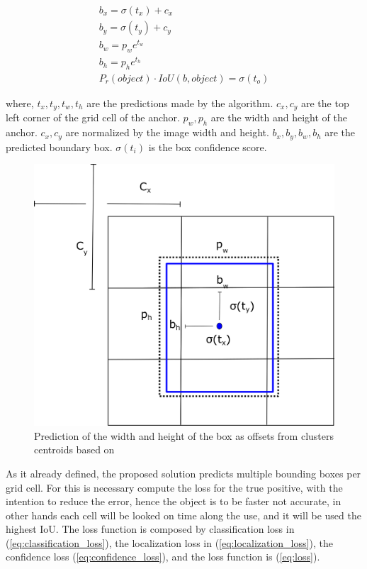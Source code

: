     
    \begin{equation}
    \label{eq:bound}
    \begin{aligned}
        b_x = \sigma(t_x) + c_x \\
        b_y = \sigma(t_y) + c_y \\
        b_w = p_we^{t_w} \\
        b_h = p_he^{t_h} \\
        P_r(object)\cdot IoU(b,object) = \sigma(t_o)
    \end{aligned}
    \end{equation}

where, $t_x, t_y, t_w, t_h$ are the predictions made by the algorithm. 
$c_x, c_y$ are the top left corner of the grid cell of the anchor.
$p_w, p_h$ are the width and height of the anchor. 
$c_x, c_y$ are normalized by the image width and height. 
$b_x, b_y, b_w, b_h$ are the predicted boundary box. 
$\sigma(t_i)$ is the box confidence score.

\begin{figure}[H]
\centering
\includegraphics[scale=0.5]{imagens/anchor.png}
\caption{Prediction of the width and height of the box as offsets from clusters centroids based on \cite{redmon2017yolo9000}}
\label{fig:anchor}
\end{figure}

As it already defined, the proposed solution predicts multiple bounding boxes per grid cell. For this is necessary compute the loss for the true positive, with the intention to reduce the error, hence the object is to be faster not accurate, in other hands each cell will be looked on time along the use, and it will be used the highest IoU. The loss function is composed by classification loss in (\ref{eq:classification_loss}), the localization loss in (\ref{eq:localization_loss}), the confidence loss (\ref{eq:confidence_loss}), and the loss function is (\ref{eq:loss}). 

